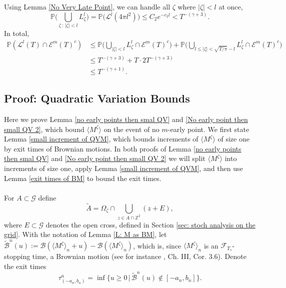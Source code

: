 \documentclass[11pt]{article}
\makeatletter
\renewenvironment{proof}[1][\proofname]{
   \par\pushQED{\qed}\normalfont
   \topsep6\p@\@plus6\p@\relax
   \trivlist\item[\hskip\labelsep\bfseries#1\@addpunct{.}]
   \ignorespaces
}{
   \popQED\endtrivlist\@endpefalse
}
\numberwithin{equation}{section}
\def\OZ{\Omega_{\zeta}}
\makeatother
\begin{document}
\begin{proof}[Proof of Lemma \ref{Late Points Imply Early Points}]
  Using Lemma \ref{No Very Late Point}, we can handle all $\zeta$ where $|\zeta| < l$ 
  at once,
  \begin{equation}
    \mathbb{P} \bigg(  
      \bigcup_ {\zeta \,:\, |\zeta| < l} L^l_{\zeta} \bigg)
    = \mathbb{P} \big( \mathcal{L}^l(4\pi l^2) \big) 
    \leq C_2 e^{-c_2 l} < T^{-(\gamma+3)}. \nonumber
  \end{equation} 
  In total,
  \begin{equation}\nonumber
    \begin{split}
      \mathbb{P}(\mathcal{L}^l(T) \cap \mathcal{E}^m(T)^c) 
      & \leq 
        \mathbb{P}\Bigg(\bigcup_ {|\zeta| < l}
        L^l_{\zeta} \cap \mathcal{E}^m(T)^c \Bigg)
      + \mathbb{P}\Bigg( \bigcup_{l \leq |\zeta| < \sqrt{T/\pi}-l} 
      L^l_{\zeta} \cap \mathcal{E}^m(T)^c \Bigg)\\
      & \leq T^{-(\gamma + 3)} + T\cdot 2 T^{-(\gamma + 3)} \\
      &  \leq T^{-(\gamma+1)}. 
    \end{split}
  \end{equation}
\end{proof}


\subsection{Proof: Quadratic Variation Bounds}
\label{sec: Proof QV Bounds}
Here we prove Lemma \ref{no early points then smal QV} and \ref{No early point then small QV 2}, 
which bound $\langle M^{\zeta}\rangle$ on the event of no $m$-early point.
We first state Lemma \ref{small increment of QVM}, which bounds 
increments of $\langle M^{\zeta}\rangle$ of size one by exit times of Brownian motions. 
In both proofs of Lemma \ref{no early points then smal QV} and 
\ref{No early point then small QV 2} we will split 
$\langle M^{\zeta}\rangle$ into increments of size one, apply Lemma \ref{small increment of QVM}, 
and then use Lemma \ref{exit times of BM} to bound the exit times. 
\\~\\ 
For $A \subset \mathcal{G}$ define 
$$
  \tilde{A} = \OZ \cap 
  \bigcup_{z \in A \cap \mathbb{Z}^2} (z + E),
$$
where $E \subset \mathcal{G}$ denotes the open cross, 
defined in Section \ref{sec: stoch analysis on the grid}.
With the notation of Lemma \ref{L: M as BM}, let 
$\tilde{\mathcal{B}}^n(u) := 
  \mathcal{B}(\langle M^{\zeta} \rangle_n + u)
  - \mathcal{B} (\langle M^{\zeta} \rangle _n)$, 
which is, since $\langle M^{\zeta} \rangle_n$ is an $\mathcal{F}_{T_s}$-stopping time, 
a Brownian motion (see for instance \cite{revuz}, Ch. III, Cor. 3.6).
Denote the exit times
\begin{equation}\nonumber
  \tau_{(-a_n, b_n)}^n = 
  \inf \{ u \geq 0 \,|\, 
    \tilde{\mathcal{B}}^n(u) 
    \notin [-a_n, b_n] \}.
\end{equation}
\end{document}
